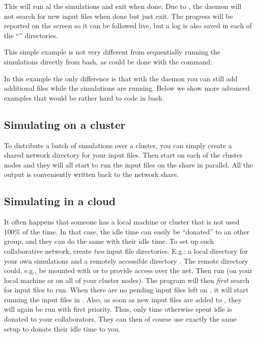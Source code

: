 This will run al the simulations and exit when done. Due to , the daemon will not search for new input files when done but just exit. The progress will be reported on the screen so it can be followed live, but a log is also saved in each of the ``'' directories.

This simple example is not very different from sequentially running the simulations directly from bash, as could be done with the command:


In this example the only difference is that with the \mumax daemon you can still add additional files while the simulations are running. Below we show more advanced examples that would be rather hard to code in bash.

\subsection{Simulating on a cluster}

To distribute a batch of simulations over a cluster, you can simply create a shared network directory for your input files. Then start \prog {} \emph{} on each of the cluster nodes
and they will all start to run the input files on the share in parallel. All the output is conveniently written back to the network share. 

\subsection{Simulating in a cloud}

It often happens that someone has a local machine or cluster that is not used 100\% of the time. In that case, the idle time can easily be ``donated'' to an other group, and they can do the same with their idle time. To set up such collaborative network, create \emph{two} input file directories. E.g.: a local directory  for your own simulations and a remotely accessible directory . The remote directory could, e.g., be mounted with  or  to provide access over the net. Then run \prog {} (on your local machine or on all of your cluster nodes). The program will then \emph{first} search  for input files to run. When there are no pending input files left on , it will start running the input files in . Also, as soon as new input files are added to , they will again be run with first priority. Thus, only time otherwise spent idle is donated to your collaborators. They can then of course use exactly the same setup to donate their idle time to you.
